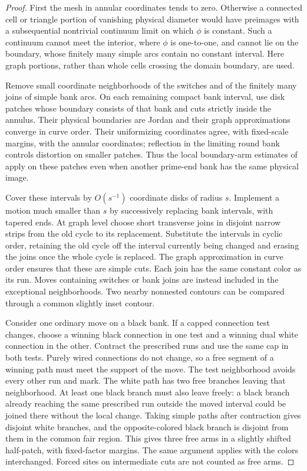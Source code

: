 \begin{proof}
First the mesh in annular coordinates tends to zero.  Otherwise a
connected cell or triangle portion of vanishing physical diameter would
have preimages with a subsequential nontrivial continuum limit on which
$\phi$ is constant.  Such a continuum cannot meet the interior, where
$\phi$ is one-to-one, and cannot lie on the boundary, whose finitely many
simple arcs contain no constant interval.  Here graph portions, rather
than whole cells crossing the domain boundary, are used.

Remove small coordinate neighborhoods of the switches and of the
finitely many joins of simple bank arcs.  On each remaining compact bank
interval, use disk patches whose boundary consists of that bank and cuts
strictly inside the annulus.  Their physical boundaries are Jordan and
their graph approximations converge in curve order.  Their uniformizing
coordinates agree, with fixed-scale margins, with the annular coordinates;
reflection in the limiting round bank controls distortion on smaller
patches.  Thus the local boundary-arm estimates of \cite{V} apply on these
patches even when another prime-end bank has the same physical image.

Cover these intervals by $O(s^{-1})$ coordinate disks of radius $s$.
Implement a motion much smaller than $s$ by successively replacing bank
intervals, with tapered ends.  At graph level choose short transverse
joins in disjoint narrow strips from the old cycle to its replacement.
Substitute the intervals in cyclic order, retaining the old cycle off the
interval currently being changed and erasing the joins once the whole
cycle is replaced.  The graph approximation in curve order ensures that
these are simple cuts.  Each join has the same constant color as its run.
Moves containing switches or bank joins are instead included in the
exceptional neighborhoods.  Two nearby nonnested contours can be
compared through a common slightly inset contour.

Consider one ordinary move on a black bank.  If a capped connection test
changes, choose a winning black connection in one test and a winning
dual white connection in the other.  Contract the prescribed runs and
use the same cap in both tests.  Purely wired connections do not change,
so a free segment of a winning path must meet the support of the move.
The test neighborhood avoids every other run and mark.  The white path
has two free branches leaving that neighborhood.  At least one black
branch must also leave freely: a black branch already reaching the same
prescribed run outside the moved interval could be joined there without
the local change.  Taking simple paths after contraction gives disjoint
white branches, and the opposite-colored black branch is disjoint from
them in the common fair region.  This gives three free arms in a slightly
shifted half-patch, with fixed-factor margins.  The same argument applies
with the colors interchanged.  Forced sites on intermediate cuts are not
counted as free arms.


\end{proof}
